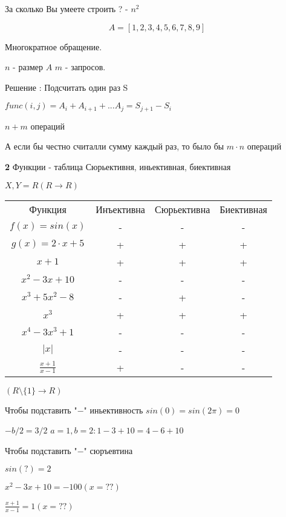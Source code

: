 \documentclass{article}
\begin{document}
За сколько Вы умеете строить ? - $n ^2$

$$A = [1,2, 3, 4, 5,6, 7, 8,9]$$

Многократное обращение.

$n$ - размер $A$
$m$ - запросов.
 
Решение :
Подсчитать один раз S

$func(i, j) = A_i + A_{i+ 1} + ... A_j = S_{j + 1} - S_i$

$n + m$ операций


А если бы честно считалли сумму каждый раз, то было бы 
$ m \cdot n$ операций

\newpage

\textbf{2} 
Функции - таблица 
Сюрьективня, иньективная, биективная

$X, Y = R (R \rightarrow R)$

\begin{center}
\begin{tabular}{ c c c c }
  Функция & Инъективна & Сюрьективна & Биективная \\
  $f(x) = sin(x)$ & - &  - &  - \\
  $g(x) = 2\cdot x + 5$ & + & + & + \\
  $x +1$ & +  & +  & + \\
  $x^2 - 3x +  10$ & - & -  &  - \\
  $x^3 + 5x^2 - 8$ & -  & + & - \\
  $x^3$ &  +  &  +  & +  \\
  $x^4 - 3x^3 + 1$ & - &  - &  - \\
  $|x|$ & -  & - & - \\
  $\frac{x + 1}{x - 1}$ & +  & - & - \\
\end{tabular}
\end{center}

$(R \setminus \{1\} \rightarrow R)$





Чтобы подставить "$-$" иньективность
$sin(0) = sin(2\pi) = 0$

$- b / 2 = 3/2 $
$a = 1, b = 2: 1 - 3 + 10 = 4 - 6 + 10$

\bigskip

Чтобы подставить "$-$" сюръевтина

$sin(?) = 2$

$x ^2 - 3x + 10 = -100 (x = ??)$ 


$\frac{x + 1}{x - 1} = 1  (x = ??)$


\bigskip
\end{document}
